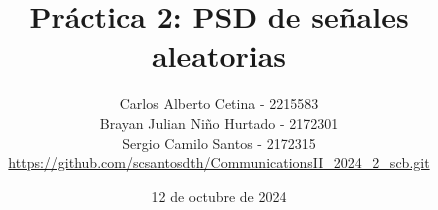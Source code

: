 \documentclass{journal}[IEEEtran, twocolumn]             %
\newcommand{\dochead}{Práctica 2}
\newcommand{\docsubhead}{PSD de señales aleatorias}
\newcommand{\titulo}{\dochead: \docsubhead}
\newcommand{\fecha}{12 de octubre de 2024}
\begin{document}

\title{\textbf{\titulo}}            %

\author{
Carlos Alberto Cetina - 2215583\\
Brayan Julian Niño Hurtado - 2172301\\
Sergio Camilo Santos - 2172315\\
\href{https://github.com/scsantosdth/CommunicationsII_2024_2_scb.git}{https://github.com/scsantosdth/CommunicationsII_2024_2_scb.git}
}


\date{\fecha}                       %

\maketitle                          %
\thispagestyle{fancy}          %

%


\color{black}
\end{document}
